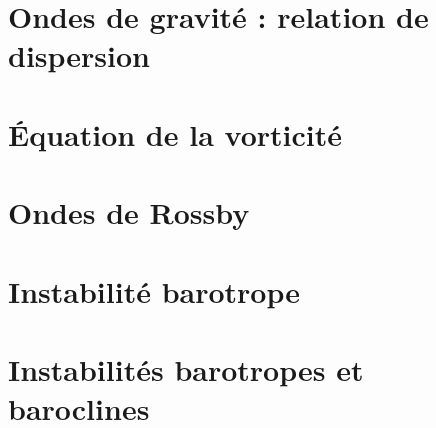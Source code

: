 \documentclass[a4paper,DIV16,10pt]{scrartcl}
\begin{document}
\newpage
\section{Ondes de gravité : relation de dispersion}


\newpage
\section{\'Equation de la vorticité}


\newpage
\section{Ondes de Rossby}


\newpage
\section{Instabilité barotrope}


\newpage
\section{Instabilités barotropes et baroclines}

\end{document}
